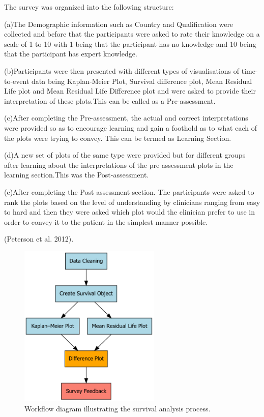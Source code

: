 \documentclass{article}
\begin{document}
The survey was organized into the following structure:

(a)The Demographic information such as Country and Qualification were collected and before that the participants were asked to rate their knowledge on a scale of 1 to 10 with 1 being that the participant has no knowledge and 10 being that the participant has expert knowledge.

(b)Participants were then presented with different types of visualisations of time-to-event data being Kaplan-Meier Plot, Survival difference plot, Mean Residual Life plot and Mean Residual Life Difference plot and were asked to provide their interpretation of these plots.This can be called as a Pre-assessment.

(c)After completing the Pre-assessment, the actual and correct interpretations were provided so as to encourage learning and gain a foothold as to what each of the plots were trying to convey. This can be termed as Learning Section.

(d)A new set of plots of the same type were provided but for different groups after learning about the interpretations of the pre assessment plots in the learning section.This was the Post-assessment.

(e)After completing the Post assessment section. The participants were asked to rank the plots based on the level of understanding by clinicians ranging from easy to hard and then they were asked which plot would the clinician prefer to use in order to convey it to the patient in the simplest manner possible.

(Peterson et al. 2012).

\begin{figure}[H]
  \centering
  \includegraphics[width=0.6\textwidth]{workflow.png}
  \caption{Workflow diagram illustrating the survival analysis process.}
  \label{fig:workflow}
\end{figure}
\end{document}
